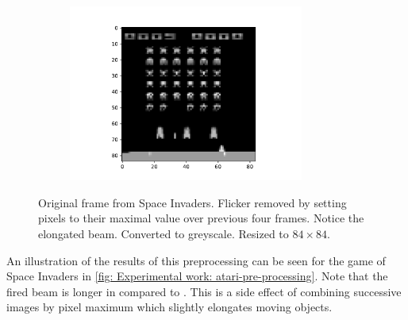\begin{figure}[tbp!]
\begin{subfigure}[b]{0.32\textwidth}
        \caption{}
        \label{fig: Experimental work: atari-pre-processing-3-spaceinvaders-grey}
    \end{subfigure}
    \centering
    \begin{subfigure}[b]{0.40\textwidth}
        \centering
        \includegraphics[height=5.8cm]{graphics/atari-pre-processing/4-spaceinvaders-resized-cropped.pdf}
        \caption{}
        \label{fig: Experimental work: atari-pre-processing-4-spaceinvaders-resized}
    \end{subfigure}
    \caption{ Original frame from Space Invaders.  Flicker removed by setting pixels to their maximal value over previous four frames. Notice the elongated beam.  Converted to greyscale.  Resized to $84\times84$.}
    \label{fig: Experimental work: atari-pre-processing}
\end{figure}

An illustration of the results of this preprocessing can be seen for the game of Space Invaders in \autoref{fig: Experimental work: atari-pre-processing}. Note that the fired beam is longer in  compared to . This is a side effect of combining successive images by pixel maximum which slightly elongates moving objects.
